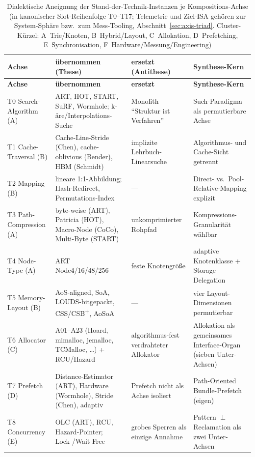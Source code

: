 {\footnotesize
\begin{longtable}{@{}p{2.3cm}p{3.7cm}p{2.7cm}p{3.6cm}@{}}
\caption{Dialektische Aneignung der Stand-der-Technik-Instanzen je Kompositions-Achse (in kanonischer Slot-Reihenfolge T0--T17; Telemetrie und Ziel-ISA gehören zur System-Sphäre bzw.\ zum Mess-Tooling, Abschnitt~\ref{sec:axis-triad}. Cluster-Kürzel: A~Trie/Knoten, B~Hybrid/Layout, C~Allokation, D~Prefetching, E~Synchronisation, F~Hardware/Messung/Engineering)}\label{tab:dialectic}\\
\toprule
\textbf{Achse} & \textbf{übernommen (These)} & \textbf{ersetzt (Antithese)} & \textbf{Synthese-Kern} \\
\midrule
\endfirsthead%
\toprule
\textbf{Achse} & \textbf{übernommen} & \textbf{ersetzt} & \textbf{Synthese-Kern} \\
\midrule
\endhead%
\bottomrule
\endlastfoot%
T0 Search-Algorithm (A) & ART, HOT, START, SuRF, Wormhole; k-äre/Interpolations-Suche & Monolith \enquote{Struktur ist Verfahren} & Such-Paradigma als permutierbare Achse \\
T1 Cache-Traversal (B) & Cache-Line-Stride (Chen), cache-oblivious (Bender), HBM (Schmidt) & implizite Lehrbuch-Linearsuche & Algorithmus- und Cache-Sicht getrennt \\
T2 Mapping (B) & lineare 1:1-Abbildung; Hash-Redirect, Permutations-Index & --- & Direct- vs.\ Pool-Relative-Mapping explizit \\
T3 Path-Compression (A) & byte-weise (ART), Patricia (HOT), Macro-Node (CoCo), Multi-Byte (START) & unkomprimierter Rohpfad & Kompressions-Granularität wählbar \\
T4 Node-Type (A) & ART Node4/16/48/256 & feste Knotengröße & adaptive Knotenklasse + Storage-Delegation \\
T5 Memory-Layout (B) & AoS-aligned, SoA, LOUDS-bitgepackt, CSS/CSB\textsuperscript{+}, AoSoA & --- & vier Layout-Dimensionen permutierbar \\
T6 Allocator (C) & A01--A23 (Hoard, mimalloc, jemalloc, TCMalloc, \ldots) + RCU/Hazard & algorithmus-fest verdrahteter Allokator & Allokation als gemeinsames Interface-Organ (sieben Unter-Achsen) \\
T7 Prefetch (D) & Distance-Estimator (ART), Hardware (Wormhole), Stride (Chen), adaptiv & Prefetch nicht als Achse isoliert & Path-Oriented Bundle-Prefetch (eigen) \\
T8 Concurrency (E) & OLC (ART), RCU, Hazard-Pointer; Lock-/Wait-Free & grobes Sperren als einzige Annahme & Pattern $\perp$ Reclamation als zwei Unter-Achsen \\

\end{longtable}}
